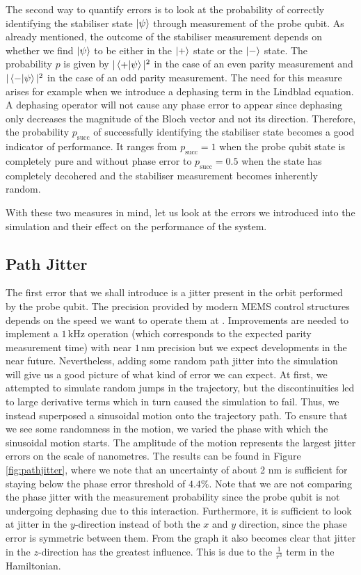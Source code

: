 The second way to quantify errors is to look at the probability of correctly identifying the stabiliser state  $\ket{\psi}$ through measurement of the probe qubit. As already mentioned, the outcome of the stabiliser measurement depends on whether we find $\ket{\psi}$ to be either in the $\ket{+}$ state or the $\ket{-}$ state. The probability $p$ is given by $|\left\langle +|\psi \right\rangle|^2$ in the case of an even parity measurement and $|\left\langle - |\psi \right\rangle|^2$ in the case of an odd parity measurement. The need for this measure arises for example when we introduce a dephasing term in the Lindblad equation. A dephasing operator will not cause any phase error to appear since dephasing only decreases the magnitude of the Bloch vector and not its direction. Therefore, the probability $p_{\textrm{succ}}$ of successfully identifying the stabiliser state becomes a good indicator of performance. It ranges from $p_{\textrm{succ}} = 1$ when the probe qubit state is completely pure and without phase error to $p_{\textrm{succ}} = 0.5$ when the state has completely decohered and the stabiliser measurement becomes inherently random. 

With these two measures in mind, let us look at the errors we introduced into the simulation and their effect on the performance of the system. 




\subsection{Path Jitter}\label{sec:jitter}
The first error that we shall introduce is a jitter present in the orbit performed by the probe qubit. The precision provided by modern MEMS control structures depends on the speed we want to operate them at \cite{Chu2003,Koo2012}. Improvements are needed to implement a $1\, $kHz operation (which corresponds to the expected parity measurement time) with near $1\, $nm precision but we expect developments in the near future. Nevertheless, adding some random path jitter into the simulation will give us a good picture of what kind of error we can expect. At first, we attempted to simulate random jumps in the trajectory, but the discontinuities led to large derivative terms which in turn caused the simulation to fail. Thus,  we instead superposed a sinusoidal motion onto the trajectory path. To ensure that we see some randomness in the motion, we varied the phase with which the sinusoidal motion starts. The amplitude of the motion represents the largest jitter errors on the scale of nanometres. The results can be found in Figure \ref{fig:pathjitter}, where we note that an uncertainty of about 2 nm is sufficient for staying below the phase error threshold of $4.4 \%$. Note that we are not comparing the phase jitter with the measurement probability since the probe qubit is not undergoing dephasing due to this interaction. Furthermore, it is sufficient to look at jitter in the $y$-direction instead of both the $x$ and $y$ direction, since the phase error is symmetric between them. 
From the graph it also becomes clear that jitter in the $z$-direction has the greatest influence. This is due to the $\frac{1}{r^3}$  term in the Hamiltonian.



